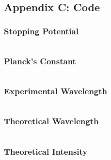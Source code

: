 \documentclass[a4paper]{article}
\begin{document}
\subsection{Appendix C: Code}

\subsubsection{Stopping Potential}
\label{cod:stoppingPotential}
\inputminted{julia}{P1-PlanksConstant/Code/getStoppingPotential.jl}

\subsubsection{Planck's Constant}
\label{cod:planck}
\inputminted{julia}{P1-PlanksConstant/Code/getPlanckConstant.jl}

\subsubsection{Experimental Wavelength}
\label{cod:expWavelength}
\inputminted{julia}{P6-BlackbodyRadiation/Code/expWavelength.jl}

\subsubsection{Theoretical Wavelength}
\label{cod:theoWavelength}
\inputminted{julia}{P6-BlackbodyRadiation/Code/theoWavelength.jl}

\subsubsection{Theoretical Intensity}
\label{cod:theoIntensity}
\inputminted{julia}{P6-BlackbodyRadiation/Code/theoIntensity.jl}
\end{document}
